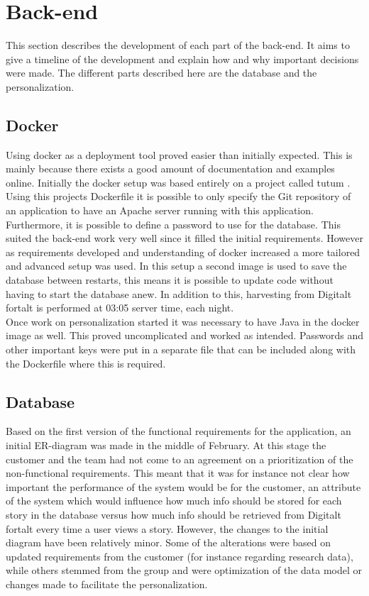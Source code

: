 \section{Back-end}

This section describes the development of each part of the back-end. It aims to give a timeline of the development and explain how and why important decisions were made. The different parts described here are the database and the personalization.  

\subsection{Docker}

Using docker as a deployment tool proved easier than initially expected. This is mainly because there exists a good amount of documentation and examples online. Initially the docker setup was based entirely on a project called tutum \cite{EHW3}. Using this projects Dockerfile it is possible to only specify the Git repository of an application to have an Apache server running with this application. Furthermore, it is possible to define a password to use for the database. This suited the back-end work very well since it filled the initial requirements. However as requirements developed and understanding of docker increased a more tailored and advanced setup was used. In this setup a second image is used to save the database between restarts, this means it is possible to update code without having to start the database anew. In addition to this, harvesting from Digitalt fortalt is performed at 03:05 server time, each night. \\

Once work on personalization started it was necessary to have Java in the docker image as well. This proved uncomplicated and worked as intended. Passwords and other important keys were put in a separate file that can be included along with the Dockerfile where this is required.

\subsection{Database}

Based on the first version of the functional requirements for the application, an initial ER-diagram was made in the middle of February. At this stage the customer and the team had not come to an agreement on a prioritization of the non-functional requirements. This meant that it was for instance not clear how important the performance of the system would be for the customer, an attribute of the system which would influence how much info should be stored for each story in the database versus how much info should be retrieved from Digitalt fortalt every time a user views a story. However, the changes to the initial diagram have been relatively minor. Some of the alterations were based on updated requirements from the customer (for instance regarding research data), while others stemmed from the group and were optimization of the data model or changes made to facilitate the personalization.\newline

